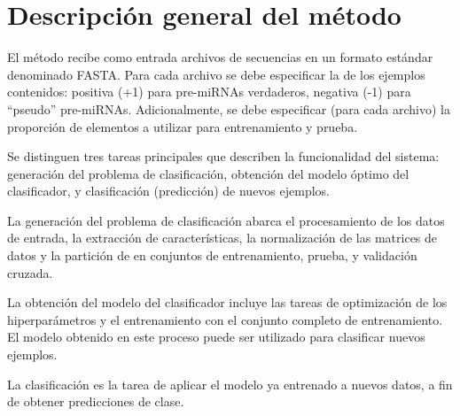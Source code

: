 \section{Descripción general del método}

El método recibe como entrada archivos de secuencias en un formato
estándar denominado FASTA. Para cada archivo se debe especificar la
 de los ejemplos contenidos: positiva (+1) para pre-miRNAs
verdaderos, negativa (-1) para ``pseudo'' pre-miRNAs.  Adicionalmente,
se debe especificar (para cada archivo) la proporción de elementos
a utilizar para entrenamiento y prueba.

Se distinguen tres tareas principales que describen la funcionalidad
del sistema: generación del problema de clasificación, obtención del
modelo óptimo del clasificador, y clasificación (predicción) de nuevos
ejemplos.

La generación del problema de clasificación abarca el procesamiento de
los datos de entrada, la extracción de características, la
normalización de las matrices de datos y la partición de en conjuntos
de entrenamiento, prueba, y validación cruzada.

La obtención del modelo del clasificador incluye las tareas de
optimización de los hiperparámetros y el entrenamiento con el conjunto
completo de entrenamiento.  El modelo obtenido en este proceso puede
ser utilizado para clasificar nuevos ejemplos.

La clasificación es la tarea de aplicar el modelo ya entrenado a
nuevos datos, a fin de obtener predicciones de clase.